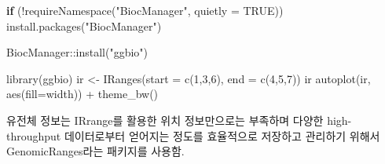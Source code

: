 \documentclass[
]{book}
\newenvironment{Shaded}{\begin{snugshade}}{\end{snugshade}}
\newcommand{\AttributeTok}[1]{\textcolor[rgb]{0.77,0.63,0.00}{#1}}
\newcommand{\ConstantTok}[1]{\textcolor[rgb]{0.00,0.00,0.00}{#1}}
\newcommand{\ControlFlowTok}[1]{\textcolor[rgb]{0.13,0.29,0.53}{\textbf{#1}}}
\newcommand{\DecValTok}[1]{\textcolor[rgb]{0.00,0.00,0.81}{#1}}
\newcommand{\FunctionTok}[1]{\textcolor[rgb]{0.00,0.00,0.00}{#1}}
\newcommand{\NormalTok}[1]{#1}
\newcommand{\OtherTok}[1]{\textcolor[rgb]{0.56,0.35,0.01}{#1}}
\newcommand{\SpecialCharTok}[1]{\textcolor[rgb]{0.00,0.00,0.00}{#1}}
\newcommand{\StringTok}[1]{\textcolor[rgb]{0.31,0.60,0.02}{#1}}
\begin{document}
\begin{Shaded}
\begin{Highlighting}[]
\ControlFlowTok{if}\NormalTok{ (}\SpecialCharTok{!}\FunctionTok{requireNamespace}\NormalTok{(}\StringTok{"BiocManager"}\NormalTok{, }\AttributeTok{quietly =} \ConstantTok{TRUE}\NormalTok{))}
    \FunctionTok{install.packages}\NormalTok{(}\StringTok{"BiocManager"}\NormalTok{)}

\NormalTok{BiocManager}\SpecialCharTok{::}\FunctionTok{install}\NormalTok{(}\StringTok{"ggbio"}\NormalTok{)}


\FunctionTok{library}\NormalTok{(ggbio)}
\NormalTok{ir }\OtherTok{\textless{}{-}} \FunctionTok{IRanges}\NormalTok{(}\AttributeTok{start =} \FunctionTok{c}\NormalTok{(}\DecValTok{1}\NormalTok{,}\DecValTok{3}\NormalTok{,}\DecValTok{6}\NormalTok{), }\AttributeTok{end =} \FunctionTok{c}\NormalTok{(}\DecValTok{4}\NormalTok{,}\DecValTok{5}\NormalTok{,}\DecValTok{7}\NormalTok{))}
\NormalTok{ir}
\FunctionTok{autoplot}\NormalTok{(ir, }\FunctionTok{aes}\NormalTok{(}\AttributeTok{fill=}\NormalTok{width)) }\SpecialCharTok{+}
  \FunctionTok{theme\_bw}\NormalTok{()}
\end{Highlighting}
\end{Shaded}

유전체 정보는 IRrange를 활용한 위치 정보만으로는 부족하며 다양한 high-throughput 데이터로부터 얻어지는 정도를 효율적으로 저장하고 관리하기 위해서 GenomicRanges라는 패키지를 사용함.
\end{document}
